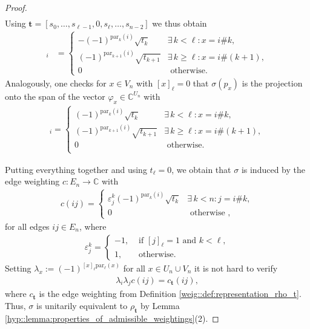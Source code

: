 \documentclass[a4paper]{amsart}
\newcommand{\C}{\mathbb{C}}
\begin{document}
\begin{proof}
\begin{align*}
    \end{align*}
    Using $\mathbf{t} = [s_0, \dots, s_{\ell-1}, 0, s_\ell, \dots, s_{n-2}]$ we thus obtain
    \begin{align*}
        [\varphi_x]_{i} &= \begin{cases}
            -(-1)^{\mathrm{par}_k(i)} \sqrt{t_k}        &\exists \, k < \ell : x = i \# k, \\
            (-1)^{\mathrm{par}_{k+1}(i)} \sqrt{t_{k+1}}       &\exists \, k \geq \ell : x = i \# (k+1), \\
            0                                           &\text{ otherwise.}
        \end{cases}
    \end{align*}
    Analogously, one checks for $x \in V_n$ with $[x]_\ell = 0$ that $\sigma(p_x)$ is the projection onto the span of the vector $\varphi_x \in \C^{U_n}$ with
    \begin{align*}
        [\varphi_x]_i = \begin{cases}
            (-1)^{\mathrm{par}_k(i)} \sqrt{t_k}                &\exists \, k < \ell : x = i \# k, \\
            (-1)^{\mathrm{par}_{k+1}(i)} \sqrt{t_{k+1}}         &\exists \, k \geq \ell : x = i \# (k+1), \\
            0                                                   &\text{ otherwise.}  \\                                
        \end{cases}
    \end{align*}
    
    Putting everything together and using $t_\ell = 0$, we obtain that $\sigma$ is induced by the edge weighting $c: E_n \to \C$ with
    \begin{align*}
        c(ij) = \begin{cases}
            \varepsilon_{j}^k (-1)^{\mathrm{par}_k(i)} \sqrt{t_k}        &\exists \, k < n : j = i \# k, \\
            0                                           &\text{ otherwise },
        \end{cases}
    \end{align*}
    for all edges $ij \in E_n$, where
    \begin{align*}
        \varepsilon_j^k = \begin{cases}
            -1,    & \text{ if } [j]_\ell = 1 \text{ and } k < \ell, \\
            1,     & \text{ otherwise.}
        \end{cases}
    \end{align*}
    Setting $\lambda_x := (-1)^{[x]_\ell \mathrm{par}_\ell(x)}$ for all $x \in U_n \cup V_n$ it is not hard to verify
    \begin{align*}
        \lambda_i \lambda_j c(ij) = c_\mathbf{t}(ij),
    \end{align*}
    where $c_\mathbf{t}$ is the edge weighting from Definition \ref{weig::def:representation_rho_t}. Thus, $\sigma$ is unitarily equivalent to $\rho_\mathbf{t}$ by Lemma \ref{hyp::lemma:properties_of_admissible_weightings}(2).
\end{proof}
\end{document}
